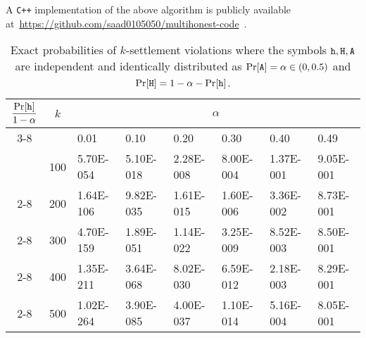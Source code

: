 A \texttt{C++} implementation of the above algorithm is publicly available 
at~\href{https://github.com/saad0105050/multihonest-code}{https://github.com/saad0105050/multihonest-code}~\cite{PrForkableMultihonestCode}.



\newcommand{\EndRow}{\cline{2-8} \multicolumn{1}{|c||}{} &}


\begin{table}[t]
	\centering
	\caption[Exact settlement error probabilities for trivalent characteristic strings]{
    Exact probabilities of $k$-settlement violations 
    where the symbols $\mathtt{h}, \mathtt{H}, \mathtt{A}$ are independent and identically distributed as $\Pr[\mathtt{A}] = \alpha \in (0, 0.5)$ and $\Pr[\mathtt{H}] = 1 - \alpha - \Pr[\mathtt{h}]$.    
	} 
	\label{table:exact-probs-mh}


	\begin{tabular}{|c||l||l|l|l|l|l|l|}
    \hline
    \multirow{2}{*}{$\dfrac{\Pr[\mathtt{h}]}{1-\alpha}$} & 
  	\multicolumn{1}{|c||}{\multirow{2}{*}{$k$}} & 
    \multicolumn{6}{c|}{$\alpha$} \\ 
    \cline{3-8} 
    \multicolumn{1}{|c||}{} &
  	\multicolumn{1}{|c||}{} &
    0.01 & 0.10 & 0.20 & 0.30 & 0.40 & 0.49\\ 
  	\hhline{|=#=#=|=|=|=|=|=|}
    \multicolumn{1}{|c||}{\multirow{5}{*}{$1.0$}}&
    100 & 5.70E-054 & 5.10E-018 & 2.28E-008 & 8.00E-004 & 1.37E-001 & 9.05E-001 \\ \EndRow
    200 & 1.64E-106 & 9.82E-035 & 1.61E-015 & 1.60E-006 & 3.36E-002 & 8.73E-001 \\ \EndRow
    300 & 4.70E-159 & 1.89E-051 & 1.14E-022 & 3.25E-009 & 8.52E-003 & 8.50E-001 \\ \EndRow
    400 & 1.35E-211 & 3.64E-068 & 8.02E-030 & 6.59E-012 & 2.18E-003 & 8.29E-001 \\ \EndRow
    500 & 1.02E-264 & 3.90E-085 & 4.00E-037 & 1.10E-014 & 5.16E-004 & 8.05E-001 \\%


\end{tabular}
\end{table}
